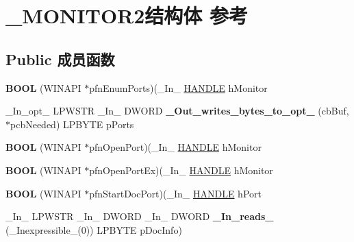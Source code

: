 \hypertarget{struct___m_o_n_i_t_o_r2}{}\section{\+\_\+\+M\+O\+N\+I\+T\+O\+R2结构体 参考}
\label{struct___m_o_n_i_t_o_r2}
\subsection*{Public 成员函数}
\begin{DoxyCompactItemize}
\item 
\mbox{\label{struct___m_o_n_i_t_o_r2_a8c30cf4cd682024c9d7ba902ebc1b46a}} 
{\bfseries B\+O\+OL} (W\+I\+N\+A\+PI $\ast$pfn\+Enum\+Ports)(\+\_\+\+In\+\_\+ \hyperlink{interfacevoid}{H\+A\+N\+D\+LE} h\+Monitor
\item 
\mbox{\label{struct___m_o_n_i_t_o_r2_a84db5877f70d8c11ba9da572ac38ef75}} 
\+\_\+\+In\+\_\+opt\+\_\+ L\+P\+W\+S\+TR \+\_\+\+In\+\_\+ D\+W\+O\+RD {\bfseries \+\_\+\+Out\+\_\+writes\+\_\+bytes\+\_\+to\+\_\+opt\+\_\+} (cb\+Buf, $\ast$pcb\+Needed) L\+P\+B\+Y\+TE p\+Ports
\item 
\mbox{\label{struct___m_o_n_i_t_o_r2_abafb66d93cc6794488bf9ca99c9656a0}} 
{\bfseries B\+O\+OL} (W\+I\+N\+A\+PI $\ast$pfn\+Open\+Port)(\+\_\+\+In\+\_\+ \hyperlink{interfacevoid}{H\+A\+N\+D\+LE} h\+Monitor
\item 
\mbox{\label{struct___m_o_n_i_t_o_r2_a64bb92a8ca6c26f65066afefc724c3a2}} 
{\bfseries B\+O\+OL} (W\+I\+N\+A\+PI $\ast$pfn\+Open\+Port\+Ex)(\+\_\+\+In\+\_\+ \hyperlink{interfacevoid}{H\+A\+N\+D\+LE} h\+Monitor
\item 
\mbox{\label{struct___m_o_n_i_t_o_r2_a893602a55503296c051b762886c1faed}} 
{\bfseries B\+O\+OL} (W\+I\+N\+A\+PI $\ast$pfn\+Start\+Doc\+Port)(\+\_\+\+In\+\_\+ \hyperlink{interfacevoid}{H\+A\+N\+D\+LE} h\+Port
\item 
\mbox{\label{struct___m_o_n_i_t_o_r2_a912e115b4c805f422ca6ce4f18d60c62}} 
\+\_\+\+In\+\_\+ L\+P\+W\+S\+TR \+\_\+\+In\+\_\+ D\+W\+O\+RD \+\_\+\+In\+\_\+ D\+W\+O\+RD {\bfseries \+\_\+\+In\+\_\+reads\+\_\+} (\+\_\+\+Inexpressible\+\_\+(0)) L\+P\+B\+Y\+TE p\+Doc\+Info)

\end{DoxyCompactItemize}
